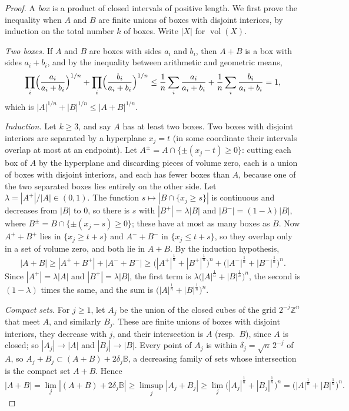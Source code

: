 \begin{proof}
A \emph{box} is a product of closed intervals of positive length. We first prove the inequality when $A$ and $B$ are finite unions of boxes with disjoint
interiors, by induction on the total number $k$ of boxes. Write $|X|$ for $\operatorname{vol}(X)$.

\emph{Two boxes.} If $A$ and $B$ are boxes with sides $a_i$ and $b_i$, then $A+B$ is a box with sides $a_i+b_i$, and by the inequality between arithmetic and geometric
means,
\[
\prod_i\Bigl(\frac{a_i}{a_i+b_i}\Bigr)^{1/n}+\prod_i\Bigl(\frac{b_i}{a_i+b_i}\Bigr)^{1/n}\le\frac1n\sum_i\frac{a_i}{a_i+b_i}+\frac1n\sum_i\frac{b_i}{a_i+b_i}=1,
\]
which is $|A|^{1/n}+|B|^{1/n}\le|A+B|^{1/n}$.

\emph{Induction.} Let $k\ge3$, and say $A$ has at least two boxes. Two boxes with disjoint interiors are separated by a hyperplane $x_j=t$ (in some coordinate their
intervals overlap at most at an endpoint). Let $A^\pm=A\cap\{\pm(x_j-t)\ge0\}$: cutting each box of $A$ by the hyperplane and discarding pieces of volume zero, each is a union of boxes with disjoint
interiors, and each has fewer boxes than $A$, because one of the two separated boxes lies entirely on the other side. Let $\lambda=|A^+|/|A|\in(0,1)$. The function $s\mapsto|B\cap\{x_j\ge s\}|$ is
continuous and decreases from $|B|$ to $0$, so there is $s$ with $|B^+|=\lambda|B|$ and $|B^-|=(1-\lambda)|B|$, where $B^\pm=B\cap\{\pm(x_j-s)\ge0\}$; these have
at most as many boxes as $B$. Now $A^++B^+$ lies in $\{x_j\ge t+s\}$ and $A^-+B^-$ in $\{x_j\le t+s\}$, so they overlap only in a set of volume zero, and both lie in
$A+B$. By the induction hypothesis,
\[
|A+B|\ge|A^++B^+|+|A^-+B^-|\ge\bigl(|A^+|^{\frac1n}+|B^+|^{\frac1n}\bigr)^n+\bigl(|A^-|^{\frac1n}+|B^-|^{\frac1n}\bigr)^n.
\]
Since $|A^+|=\lambda|A|$ and $|B^+|=\lambda|B|$, the first term is $\lambda\bigl(|A|^{\frac1n}+|B|^{\frac1n}\bigr)^n$, the second is $(1-\lambda)$ times the same, and the
sum is $\bigl(|A|^{\frac1n}+|B|^{\frac1n}\bigr)^n$.

\emph{Compact sets.} For $j\ge1$, let $A_j$ be the union of the closed cubes of the grid $2^{-j}\mathbb Z^n$ that meet $A$, and similarly $B_j$. These are finite
unions of boxes with disjoint interiors, they decrease with $j$, and their intersection is $A$ (resp.\ $B$), since $A$ is closed; so
$|A_j|\to|A|$ and $|B_j|\to|B|$. Every point of $A_j$ is within $\delta_j=\sqrt n\,2^{-j}$ of $A$, so $A_j+B_j\subset(A+B)+2\delta_j\mathbb B$, a decreasing family of
sets whose intersection is the compact set $A+B$. Hence
\[
|A+B|=\lim_j|(A+B)+2\delta_j\mathbb B|\ge\limsup_j|A_j+B_j|\ge\lim_j\bigl(|A_j|^{\frac1n}+|B_j|^{\frac1n}\bigr)^n=\bigl(|A|^{\frac1n}+|B|^{\frac1n}\bigr)^n.
\]
\end{proof}

